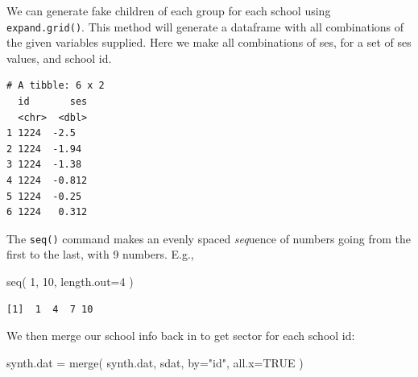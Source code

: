 \documentclass[
  letterpaper,
  DIV=11,
  numbers=noendperiod]{scrreprt}
\newenvironment{Shaded}{\begin{snugshade}}{\end{snugshade}}
\newcommand{\AttributeTok}[1]{\textcolor[rgb]{0.49,0.56,0.16}{#1}}
\newcommand{\ConstantTok}[1]{\textcolor[rgb]{0.53,0.00,0.00}{#1}}
\newcommand{\DecValTok}[1]{\textcolor[rgb]{0.25,0.63,0.44}{#1}}
\newcommand{\FloatTok}[1]{\textcolor[rgb]{0.25,0.63,0.44}{#1}}
\newcommand{\FunctionTok}[1]{\textcolor[rgb]{0.02,0.16,0.49}{#1}}
\newcommand{\NormalTok}[1]{\textcolor[rgb]{0.00,0.44,0.13}{#1}}
\newcommand{\OtherTok}[1]{\textcolor[rgb]{0.00,0.44,0.13}{#1}}
\newcommand{\SpecialCharTok}[1]{\textcolor[rgb]{0.25,0.44,0.63}{#1}}
\newcommand{\StringTok}[1]{\textcolor[rgb]{0.25,0.44,0.63}{#1}}
\begin{document}
We can generate fake children of each group for each school using
\texttt{expand.grid()}. This method will generate a dataframe with all
combinations of the given variables supplied. Here we make all
combinations of ses, for a set of ses values, and school id.

\begin{Shaded}
\end{Shaded}

\begin{verbatim}
# A tibble: 6 x 2
  id       ses
  <chr>  <dbl>
1 1224  -2.5  
2 1224  -1.94 
3 1224  -1.38 
4 1224  -0.812
5 1224  -0.25 
6 1224   0.312
\end{verbatim}

The \texttt{seq()} command makes an evenly spaced \emph{seq}uence of
numbers going from the first to the last, with 9 numbers. E.g.,

\begin{Shaded}
\begin{Highlighting}[]
\FunctionTok{seq}\NormalTok{( }\DecValTok{1}\NormalTok{, }\DecValTok{10}\NormalTok{, }\AttributeTok{length.out=}\DecValTok{4}\NormalTok{ )}
\end{Highlighting}
\end{Shaded}

\begin{verbatim}
[1]  1  4  7 10
\end{verbatim}

We then merge our school info back in to get sector for each school id:

\begin{Shaded}
\begin{Highlighting}[]
\NormalTok{synth.dat }\OtherTok{=} \FunctionTok{merge}\NormalTok{( synth.dat, sdat, }\AttributeTok{by=}\StringTok{"id"}\NormalTok{, }\AttributeTok{all.x=}\ConstantTok{TRUE}\NormalTok{ )}
\end{Highlighting}
\end{Shaded}
\end{document}
